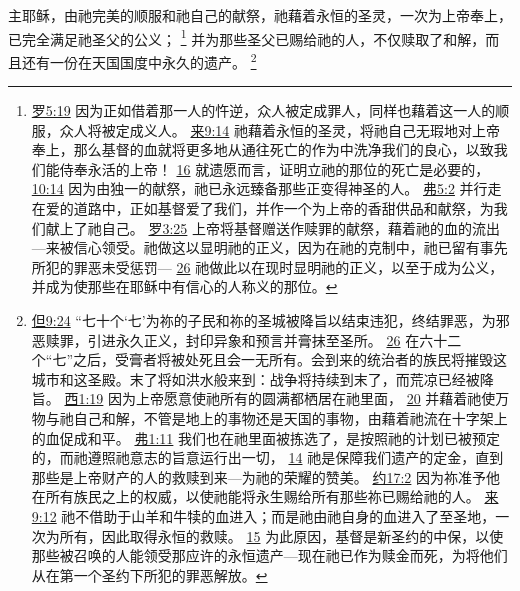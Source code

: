 \documentclass[12pt, a4paper, oneside]{ctexart}
\newcounter{parnum}[section]
\newcommand{\N}{%
   \noindent\refstepcounter{parnum}%
    \makebox[\parindent][l]{\textbf{\arabic{parnum}.}}}
\begin{document}
\N 主耶稣，由祂完美的顺服和祂自己的献祭，祂藉着永恒的圣灵，一次为上帝奉上，已完全满足祂圣父的公义；
	\footnote {
		\href{https://biblehub.com/romans/5-19.htm}{罗5:19} 因为正如借着那一人的忤逆，众人被定成罪人，同样也藉着这一人的顺服，众人将被定成义人。
		\href{https://biblehub.com/hebrews/9-14.htm}{来9:14} 祂藉着永恒的圣灵，将祂自己无瑕地对上帝奉上，那么基督的血就将更多地从通往死亡的作为中洗净我们的良心，以致我们能侍奉永活的上帝！
		\href{https://biblehub.com/hebrews/9-16.htm}{16} 就遗愿而言，证明立祂的那位的死亡是必要的，
		\href{https://biblehub.com/hebrews/10-14.htm}{10:14} 因为由独一的献祭，祂已永远臻备那些正变得神圣的人。
		\href{https://biblehub.com/ephesians/5-2.htm}{弗5:2} 并行走在爱的道路中，正如基督爱了我们，并作一个为上帝的香甜供品和献祭，为我们献上了祂自己。
		\href{https://biblehub.com/romans/3-25.htm}{罗3:25} 上帝将基督赠送作赎罪的献祭，藉着祂的血的流出---来被信心领受。祂做这以显明祂的正义，因为在祂的克制中，祂已留有事先所犯的罪恶未受惩罚---
		\href{https://biblehub.com/romans/3-26.htm}{26} 祂做此以在现时显明祂的正义，以至于成为公义，并成为使那些在耶稣中有信心的人称义的那位。
	}
	并为那些圣父已赐给祂的人，不仅赎取了和解，而且还有一份在天国国度中永久的遗产。
	\footnote {
		\href{https://biblehub.com/daniel/9-24.htm}{但9:24} “七十个‘七’为祢的子民和祢的圣城被降旨以结束违犯，终结罪恶，为邪恶赎罪，引进永久正义，封印异象和预言并膏抹至圣所。
		\href{https://biblehub.com/daniel/9-26.htm}{26} 在六十二个“七”之后，受膏者将被处死且会一无所有。会到来的统治者的族民将摧毁这城市和这圣殿。末了将如洪水般来到：战争将持续到末了，而荒凉已经被降旨。
		\href{https://biblehub.com/colossians/1-19.htm}{西1:19} 因为上帝愿意使祂所有的圆满都栖居在祂里面，
		\href{https://biblehub.com/colossians/1-20.htm}{20} 并藉着祂使万物与祂自己和解，不管是地上的事物还是天国的事物，由藉着祂流在十字架上的血促成和平。
		\href{https://biblehub.com/ephesians/1-11.htm}{弗1:11} 我们也在祂里面被拣选了，是按照祂的计划已被预定的，而祂遵照祂意志的旨意运行出一切，
		\href{https://biblehub.com/ephesians/1-14.htm}{14} 祂是保障我们遗产的定金，直到那些是上帝财产的人的救赎到来---为祂的荣耀的赞美。
		\href{https://biblehub.com/john/17-2.htm}{约17:2} 因为祢准予他在所有族民之上的权威，以使祂能将永生赐给所有那些祢已赐给祂的人。
		\href{https://biblehub.com/hebrews/9-12.htm}{来9:12} 祂不借助于山羊和牛犊的血进入；而是祂由祂自身的血进入了至圣地，一次为所有，因此取得永恒的救赎。
		\href{https://biblehub.com/hebrews/9-15.htm}{15} 为此原因，基督是新圣约的中保，以使那些被召唤的人能领受那应许的永恒遗产---现在祂已作为赎金而死，为将他们从在第一个圣约下所犯的罪恶解放。
	}
\end{document}
